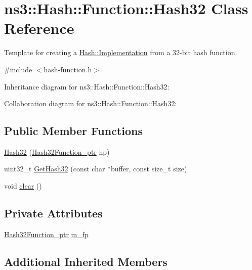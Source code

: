 \hypertarget{classns3_1_1Hash_1_1Function_1_1Hash32}{}\section{ns3\+:\+:Hash\+:\+:Function\+:\+:Hash32 Class Reference}
\label{classns3_1_1Hash_1_1Function_1_1Hash32}


Template for creating a \hyperlink{classns3_1_1Hash_1_1Implementation}{Hash\+::\+Implementation} from a 32-\/bit hash function.  




{\ttfamily \#include $<$hash-\/function.\+h$>$}



Inheritance diagram for ns3\+:\+:Hash\+:\+:Function\+:\+:Hash32\+:


Collaboration diagram for ns3\+:\+:Hash\+:\+:Function\+:\+:Hash32\+:
\subsection*{Public Member Functions}
\begin{DoxyCompactItemize}
\item 
\hyperlink{classns3_1_1Hash_1_1Function_1_1Hash32_a6b5de5f1d6ec1c808257965bf5f9098b}{Hash32} (\hyperlink{group__hash_gaf05ee221eddbade063bfefbf34ed485a}{Hash32\+Function\+\_\+ptr} hp)
\item 
uint32\+\_\+t \hyperlink{classns3_1_1Hash_1_1Function_1_1Hash32_ad2fa3b79f9b2c13b19280b15f0c68971}{Get\+Hash32} (const char $\ast$buffer, const size\+\_\+t size)
\item 
void \hyperlink{classns3_1_1Hash_1_1Function_1_1Hash32_ab325a36fdb89beb6713f8a271196f37b}{clear} ()
\end{DoxyCompactItemize}
\subsection*{Private Attributes}
\begin{DoxyCompactItemize}
\item 
\hyperlink{group__hash_gaf05ee221eddbade063bfefbf34ed485a}{Hash32\+Function\+\_\+ptr} \hyperlink{classns3_1_1Hash_1_1Function_1_1Hash32_a71b519cd7ddd3a2be8dcf321311b074d}{m\+\_\+fp}
\end{DoxyCompactItemize}
\subsection*{Additional Inherited Members}


